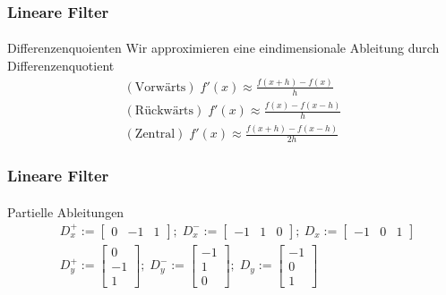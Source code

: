 \documentclass{beamer}
\begin{document}
\begin{frame}
    \frametitle{Lineare Filter}
\framesubtitle{}

\begin{block}{Differenzenquoienten}
Wir approximieren eine eindimensionale Ableitung durch  Differenzenquotient 
\begin{align*}
(\text{Vorwärts}) \; f'(x) \approx \frac{f(x +h )- f(x) }{h} \\
(\text{Rückwärts}) \; f'(x) \approx \frac{f(x)- f(x -h) }{h} \\
(\text{Zentral}) \; f'(x) \approx \frac{f(x +h)- f(x -h) }{2h} 
\end{align*}
 
\end{block}
 \end{frame}

\begin{frame}
    \frametitle{Lineare Filter}
\framesubtitle{}

\begin{block}{Partielle Ableitungen}
\begin{align*}
& D_x^+:= \begin{bmatrix}  0 & -1 & 1\end{bmatrix} ; \; D_x^-:= \begin{bmatrix}  -1 & 1 & 0\end{bmatrix} ;\: D_x:= \begin{bmatrix}  -1 & 0 & 1\end{bmatrix} \\
& D_y^+ :=  \begin{bmatrix}  0 \\ -1 \\ 1\end{bmatrix} ; \; D_y^- :=  \begin{bmatrix}  -1 \\ 1 \\ 0\end{bmatrix} ; \; D_y :=  \begin{bmatrix}  -1 \\ 0 \\ 1\end{bmatrix} 
\end{align*}

\end{block}
 \end{frame}
\end{document}
